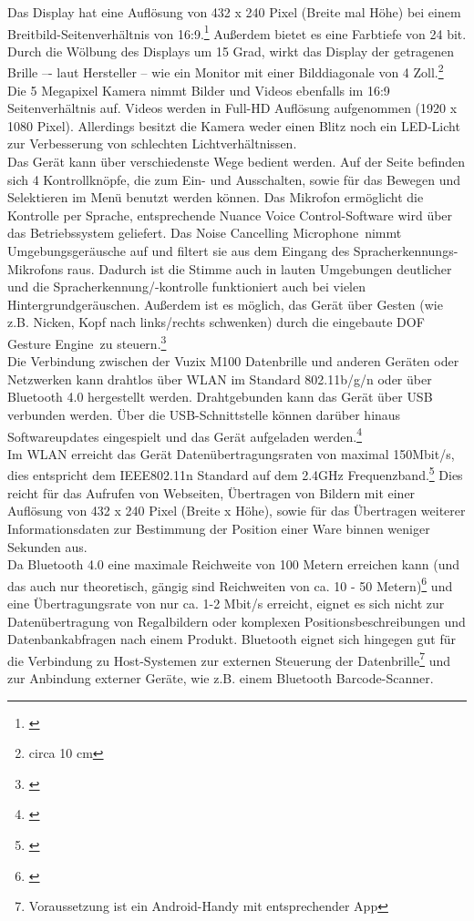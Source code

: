 Das Display hat eine Auflösung von 432 x 240 Pixel (Breite mal Höhe) bei einem Breitbild-Seitenverhältnis von 16:9.\footnote{\citep{wqvga}} Außerdem bietet es eine Farbtiefe von 24 bit. Durch die Wölbung des Displays um 15 Grad, wirkt das Display der getragenen Brille –- laut Hersteller -- wie ein Monitor mit einer Bilddiagonale von 4 Zoll.\footnote{circa 10 \ac{cm}}\\

Die 5 Megapixel Kamera nimmt Bilder und Videos ebenfalls im 16:9 Seitenverhältnis auf. Videos werden in Full-\acs{HD} Auflösung aufgenommen (1920 x 1080 Pixel). Allerdings besitzt die Kamera weder einen Blitz noch ein LED-Licht zur Verbesserung von schlechten Lichtverhältnissen.\\

Das Gerät kann über verschiedenste Wege bedient werden. Auf der Seite befinden sich 4 Kontrollknöpfe, die zum Ein- und Ausschalten, sowie für das Bewegen und Selektieren im Menü benutzt werden können. Das Mikrofon ermöglicht die Kontrolle per Sprache, entsprechende \glqq Nuance Voice Control\grqq -Software wird über das Betriebssystem geliefert. Das \glqq Noise Cancelling Microphone\grqq\ nimmt Umgebungsgeräusche auf und filtert sie aus dem Eingang des Spracherkennungs-Mikrofons raus. Dadurch ist die Stimme auch in lauten Umgebungen deutlicher und die Spracherkennung/-kontrolle funktioniert auch bei vielen Hintergrundgeräuschen. Außerdem ist es möglich, das Gerät über Gesten (wie z.B. Nicken, Kopf nach links/rechts schwenken) durch die eingebaute  DOF Gesture Engine\grqq\ zu steuern.\footnote{\citep{vuzixm100}}\\

Die Verbindung zwischen der Vuzix M100 Datenbrille und anderen Geräten oder Netzwerken kann drahtlos über WLAN im Standard 802.11b/g/n oder über Bluetooth 4.0 hergestellt werden. Drahtgebunden kann das Gerät über \ac{USB} verbunden werden. Über die \ac{USB}-Schnittstelle können darüber hinaus Softwareupdates eingespielt und das Gerät aufgeladen werden.\footnote{\citep{vuzixm100}}\\
Im \ac{WLAN} erreicht das Gerät Datenübertragungsraten von maximal 150Mbit/s, dies entspricht dem IEEE802.11n Standard auf dem 2.4GHz Frequenzband.\footnote{\citep{uebertragungsgeschwindigkeit}} Dies reicht für das Aufrufen von Webseiten, Übertragen von Bildern mit einer Auflösung von 432 x 240 Pixel (Breite x Höhe), sowie für das Übertragen weiterer Informationsdaten zur Bestimmung der Position einer Ware binnen weniger Sekunden aus.\\
Da Bluetooth 4.0 eine maximale Reichweite von 100 Metern erreichen kann (und das auch nur theoretisch, gängig sind Reichweiten von ca. 10 - 50 Metern)\footnote{\citep{bluetooth}} und eine Übertragungsrate von nur ca. 1-2 Mbit/s erreicht, eignet es sich nicht zur Datenübertragung von Regalbildern oder komplexen Positionsbeschreibungen und Datenbankabfragen nach einem Produkt. Bluetooth eignet sich hingegen gut für die Verbindung zu Host-Systemen zur externen Steuerung der Datenbrille\footnote{Voraussetzung ist ein Android-Handy mit entsprechender App} und zur Anbindung externer Geräte, wie z.B. einem Bluetooth Barcode-Scanner.

